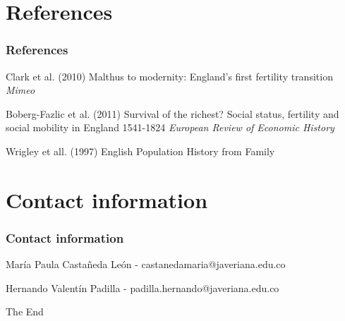 \documentclass[pdftex,12pt,xcolor=pdftex,table]{beamer}
\begin{document}
\section{References}
\begin{frame}
\frametitle{References}
\footnotesize{
\begin{thebibliography}{99} %
 Clark et al. (2010)
\newblock Malthus to modernity: England’s first
fertility transition
\newblock \emph{Mimeo}
\end{thebibliography}
}
\footnotesize{
\begin{thebibliography}{99} %
 Boberg-Fazlic et al. (2011)
\newblock Survival of the richest? Social status, fertility and social mobility in England 1541-1824
\newblock \emph{European Review of Economic History}
\end{thebibliography}
}
\footnotesize{
\begin{thebibliography}{99} %
  Wrigley et all. (1997)
\newblock English Population History from Family
\end{thebibliography}
}
\end{frame}

%
%

\section{Contact information}
\begin{frame}
\frametitle{Contact information}

María Paula Castañeda León - castanedamaria@javeriana.edu.co

Hernando Valentín Padilla - padilla.hernando@javeriana.edu.co

\end{frame}


%
%

\begin{frame}
\Huge{\centerline{The End}}
\end{frame}

\end{document}
